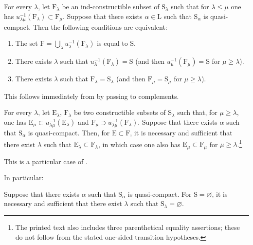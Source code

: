 \begin{corollary}[8.3.4]
\label{IV.8.3.4}
For every $\lambda$, let $\mathrm{F}_\lambda$ be an ind-constructible subset of $\mathrm{S}_\lambda$ such that for $\lambda\leqslant\mu$ one has $u_{\lambda\mu}^{-1}(\mathrm{F}_\lambda)\subset\mathrm{F}_\mu$.
Suppose that there exists $\alpha\in\mathrm{L}$ such that $\mathrm{S}_\alpha$ is quasi-compact.
Then the following conditions are equivalent:
\begin{enumerate}[label=\emph{\alph*)}]
  \item The set $\mathrm{F}=\bigcup_\lambda u_\lambda^{-1}(\mathrm{F}_\lambda)$ is equal to $\mathrm{S}$.
  \item There exists $\lambda$ such that $u_\lambda^{-1}(\mathrm{F}_\lambda)=\mathrm{S}$ (and then $u_\mu^{-1}(\mathrm{F}_\mu)=\mathrm{S}$ for $\mu\geqslant\lambda$).
  \item There exists $\lambda$ such that $\mathrm{F}_\lambda=\mathrm{S}_\lambda$ (and then $\mathrm{F}_\mu=\mathrm{S}_\mu$ for $\mu\geqslant\lambda$).
\end{enumerate}
This follows immediately from  by passing to complements.
\end{corollary}

\begin{corollary}[8.3.5]
\label{IV.8.3.5}
For every $\lambda$, let $\mathrm{E}_\lambda$, $\mathrm{F}_\lambda$ be two constructible subsets of $\mathrm{S}_\lambda$ such that, for $\mu\geqslant\lambda$, one has $\mathrm{E}_\mu\subset u_{\lambda\mu}^{-1}(\mathrm{E}_\lambda)$ and $\mathrm{F}_\mu\supset u_{\lambda\mu}^{-1}(\mathrm{F}_\lambda)$.
Suppose that there exists $\alpha$ such that $\mathrm{S}_\alpha$ is quasi-compact.
Then, for $\mathrm{E}\subset\mathrm{F}$, it is necessary and sufficient that there exist $\lambda$ such that $\mathrm{E}_\lambda\subset\mathrm{F}_\lambda$, in which case one also has $\mathrm{E}_\mu\subset\mathrm{F}_\mu$ for $\mu\geqslant\lambda$.\footnote{The printed text also includes three parenthetical equality assertions; these do not follow from the stated one-sided transition hypotheses.}

This is a particular case of .
\end{corollary}

In particular:

\begin{corollary}[8.3.6]
\label{IV.8.3.6}
Suppose that there exists $\alpha$ such that $\mathrm{S}_\alpha$ is quasi-compact.
For $\mathrm{S}=\varnothing$, it is necessary and sufficient that there exist $\lambda$ such that $\mathrm{S}_\lambda=\varnothing$.
\end{corollary}

